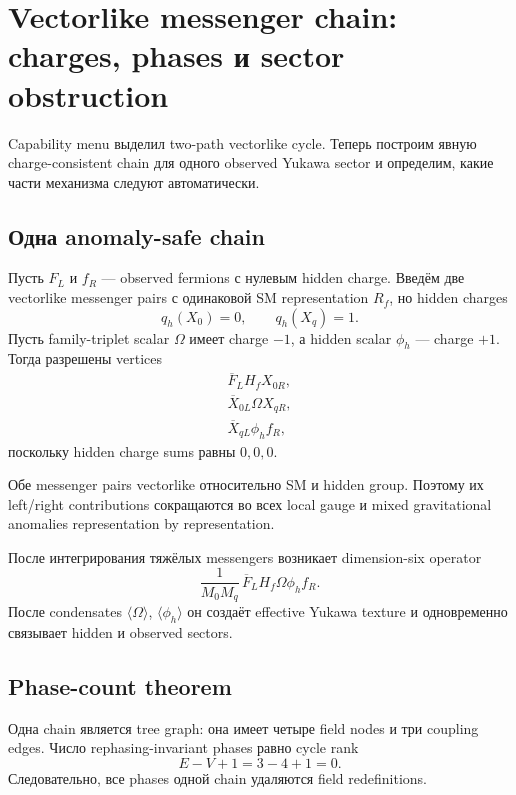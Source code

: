 \chapter{Vectorlike messenger chain: charges, phases и sector obstruction}

Capability menu выделил two-path vectorlike cycle. Теперь построим явную
charge-consistent chain для одного observed Yukawa sector и определим, какие
части механизма следуют автоматически.

\section{Одна anomaly-safe chain}

Пусть \(F_L\) и \(f_R\) --- observed fermions с нулевым hidden charge.
Введём две vectorlike messenger pairs с одинаковой SM representation
\(R_f\), но hidden charges
\begin{equation}
q_h(X_0)=0,
\qquad
q_h(X_q)=1.
\end{equation}
Пусть family-triplet scalar \(\Omega\) имеет charge \(-1\), а hidden scalar
\(\phi_h\) --- charge \(+1\). Тогда разрешены vertices
\begin{align}
\overline F_L H_f X_{0R},\\
\overline X_{0L}\Omega X_{qR},\\
\overline X_{qL}\phi_h f_R,
\end{align}
поскольку hidden charge sums равны \(0,0,0\).

Обе messenger pairs vectorlike относительно SM и hidden group. Поэтому их
left/right contributions сокращаются во всех local gauge и mixed
gravitational anomalies representation by representation.

После интегрирования тяжёлых messengers возникает dimension-six operator
\begin{equation}
\frac{1}{M_0M_q}\,
\overline F_L H_f\Omega\phi_h f_R.
\end{equation}
После condensates \(\langle\Omega\rangle\), \(\langle\phi_h\rangle\) он
создаёт effective Yukawa texture и одновременно связывает hidden и observed
sectors.

\section{Phase-count theorem}

Одна chain является tree graph: она имеет четыре field nodes и три coupling
edges. Число rephasing-invariant phases равно cycle rank
\begin{equation}
E-V+1=3-4+1=0.
\end{equation}
Следовательно, все phases одной chain удаляются field redefinitions.

